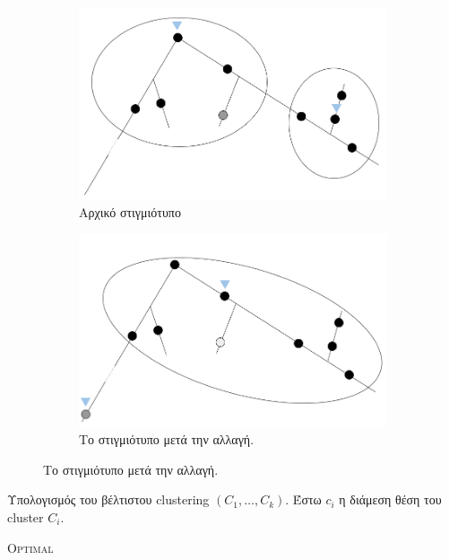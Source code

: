 \begin{figure}[ht]
\centering
    \begin{subfigure}[b]{0.35\textwidth}
         \centering
         \includegraphics[width=\textwidth]{Images/stable1.png}
         \caption{Αρχικό στιγμιότυπο}
         \label{fig:original}
     \end{subfigure}
    \hspace{50pt}
    \begin{subfigure}[b]{0.35\textwidth}
         \centering
         \includegraphics[width=\textwidth]{Images/stable2.png}
         \caption{Το στιγμιότυπο μετά την αλλαγή.}
         \label{fig:deviation}
     \end{subfigure}
    \end{figure}

\begin{algorithm}[ht]
\label{algorithm:optimalgr}
\DontPrintSemicolon
\SetAlgoLined
\LinesNumbered
{}
Υπολογισμός του βέλτιστου clustering
 $(C_1, \ldots, C_k)$. Έστω $c_i$ η διάμεση θέση του cluster $C_i$.\;


\caption{\textsc{Optimal}}
\end{algorithm}

